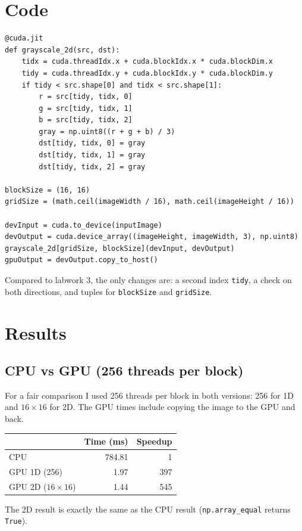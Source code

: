 \documentclass[11pt,a4paper]{article}
\begin{document}
\section{Code}
\begin{verbatim}
@cuda.jit
def grayscale_2d(src, dst):
    tidx = cuda.threadIdx.x + cuda.blockIdx.x * cuda.blockDim.x
    tidy = cuda.threadIdx.y + cuda.blockIdx.y * cuda.blockDim.y
    if tidy < src.shape[0] and tidx < src.shape[1]:
        r = src[tidy, tidx, 0]
        g = src[tidy, tidx, 1]
        b = src[tidy, tidx, 2]
        gray = np.uint8((r + g + b) / 3)
        dst[tidy, tidx, 0] = gray
        dst[tidy, tidx, 1] = gray
        dst[tidy, tidx, 2] = gray

blockSize = (16, 16)
gridSize = (math.ceil(imageWidth / 16), math.ceil(imageHeight / 16))

devInput = cuda.to_device(inputImage)
devOutput = cuda.device_array((imageHeight, imageWidth, 3), np.uint8)
grayscale_2d[gridSize, blockSize](devInput, devOutput)
gpuOutput = devOutput.copy_to_host()
\end{verbatim}
Compared to labwork 3, the only changes are: a second index
\texttt{tidy}, a check on both directions, and tuples for
\texttt{blockSize} and \texttt{gridSize}.

\section{Results}

\subsection{CPU vs GPU (256 threads per block)}
For a fair comparison I used 256 threads per block in both versions:
256 for 1D and $16 \times 16$ for 2D. The GPU times include copying the
image to the GPU and back.

\begin{center}
\begin{tabular}{|l|r|r|}
\hline
                       & Time (ms) & Speedup \\ \hline
CPU                    & 784.81    & 1       \\ \hline
GPU 1D (256)           & 1.97      & 397     \\ \hline
GPU 2D ($16 \times 16$) & 1.44      & 545     \\ \hline
\end{tabular}
\end{center}
The 2D result is exactly the same as the CPU result
(\texttt{np.array\_equal} returns \texttt{True}).
\end{document}
